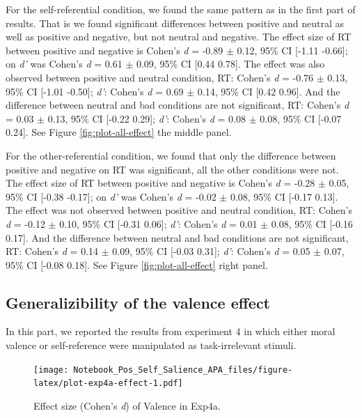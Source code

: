 \documentclass[
  english,
  man]{apa6}
\begin{document}
For the self-referential condition, we found the same pattern as in the first part of results. That is we found significant differences between positive and neutral as well as positive and negative, but not neutral and negative. The effect size of RT between positive and negative is Cohen's \emph{d} = -0.89 \(\pm\) 0.12, 95\% CI {[}-1.11 -0.66{]}; on \emph{d'} was Cohen's \emph{d} = 0.61 \(\pm\) 0.09, 95\% CI {[}0.44 0.78{]}. The effect was also observed between positive and neutral condition, RT: Cohen's \emph{d} = -0.76 \(\pm\) 0.13, 95\% CI {[}-1.01 -0.50{]}; \emph{d'}: Cohen's \emph{d} = 0.69 \(\pm\) 0.14, 95\% CI {[}0.42 0.96{]}. And the difference between neutral and bad conditions are not significant, RT: Cohen's \emph{d} = 0.03 \(\pm\) 0.13, 95\% CI {[}-0.22 0.29{]}; \emph{d'}: Cohen's \emph{d} = 0.08 \(\pm\) 0.08, 95\% CI {[}-0.07 0.24{]}. See Figure \ref{fig:plot-all-effect} the middle panel.

For the other-referential condition, we found that only the difference between positive and negative on RT was significant, all the other conditions were not. The effect size of RT between positive and negative is Cohen's \emph{d} = -0.28 \(\pm\) 0.05, 95\% CI {[}-0.38 -0.17{]}; on \emph{d'} was Cohen's \emph{d} = -0.02 \(\pm\) 0.08, 95\% CI {[}-0.17 0.13{]}. The effect was not observed between positive and neutral condition, RT: Cohen's \emph{d} = -0.12 \(\pm\) 0.10, 95\% CI {[}-0.31 0.06{]}; \emph{d'}: Cohen's \emph{d} = 0.01 \(\pm\) 0.08, 95\% CI {[}-0.16 0.17{]}. And the difference between neutral and bad conditions are not significant, RT: Cohen's \emph{d} = 0.14 \(\pm\) 0.09, 95\% CI {[}-0.03 0.31{]}; \emph{d'}: Cohen's \emph{d} = 0.05 \(\pm\) 0.07, 95\% CI {[}-0.08 0.18{]}. See Figure \ref{fig:plot-all-effect} right panel.

\hypertarget{generalizibility-of-the-valence-effect}{%
\subsection{Generalizibility of the valence effect}\label{generalizibility-of-the-valence-effect}}

In this part, we reported the results from experiment 4 in which either moral valence or self-reference were manipulated as task-irrelevant stimuli.

\begin{figure}
\centering
\texttt{[image: Notebook\_Pos\_Self\_Salience\_APA\_files/figure-latex/plot-exp4a-effect-1.pdf]}
\caption{\label{fig:plot-exp4a-effect}Effect size (Cohen's \emph{d}) of Valence in Exp4a.}
\end{figure}
\end{document}
